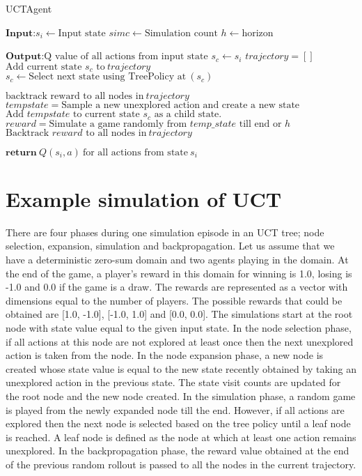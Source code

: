 \documentclass[double,12pt]{beavtex}
\begin{document}
\begin{algorithm}
	\caption{UCTAgent}
	\label{alg:smartmeter}
	\begin{algorithmic}[1]
		\Statex $\textbf{Input:}   s_i \leftarrow \text{Input state}$
		\Statex $simc\leftarrow \text{Simulation count}$ 
		\Statex $h\leftarrow \text{horizon}$

		\Statex $\textbf{Output:}  \text{Q value of all actions from input state}$
			\State $s_c \leftarrow s_i$
			\State $trajectory = []$
				\State $\text{Add current state $s_c$ to}~trajectory$
				\State $s_c \leftarrow \text{Select next state using TreePolicy at}~(s_c)$
			\EndWhile

				\State $\text{backtrack reward to all nodes in}~trajectory$
			\Else
				\State $tempstate = \text{Sample a new unexplored action and create a new state}$
				\State $\text{Add $tempstate$ to current state $s_c$ as a child state.}$
				\State $reward = \text{Simulate a game randomly from $temp\_state$ till end or $h$}$
				\State $\text{Backtrack $reward$ to all nodes in}~trajectory$
			\EndIf
		\EndFor

		\Statex $\textbf{return}~Q(s_i,a)~\text{for all actions from state}~s_i$
	\end{algorithmic}
\end{algorithm}

\section{Example simulation of UCT}
There are four phases during one simulation episode in an UCT tree; node selection, expansion, simulation and backpropagation. Let us assume that we have a deterministic zero-sum domain and two agents playing in the domain. At the end of the game, a player's reward in this domain for winning is 1.0, losing is -1.0 and 0.0 if the game is a draw. The rewards are represented as a vector with dimensions equal to the number of players. The possible rewards that could be obtained are [1.0, -1.0], [-1.0, 1.0] and [0.0, 0.0]. The simulations start at the root node with state value equal to the given input state. In the node selection phase, if all actions at this node are not explored at least once then the next unexplored action is taken from the node. In the node expansion phase, a new node is created whose state value is equal to the new state recently obtained by taking an unexplored action in the previous state. The state visit counts are updated for the root node and the new node created. In the simulation phase, a random game is played from the newly expanded node till the end. However, if all actions are explored then the next node is selected based on the tree policy until a leaf node is reached. A leaf node is defined as the node at which at least one action remains unexplored. In the backpropagation phase, the reward value obtained at the end of the previous random rollout is passed to all the nodes in the current trajectory.
\end{document}
